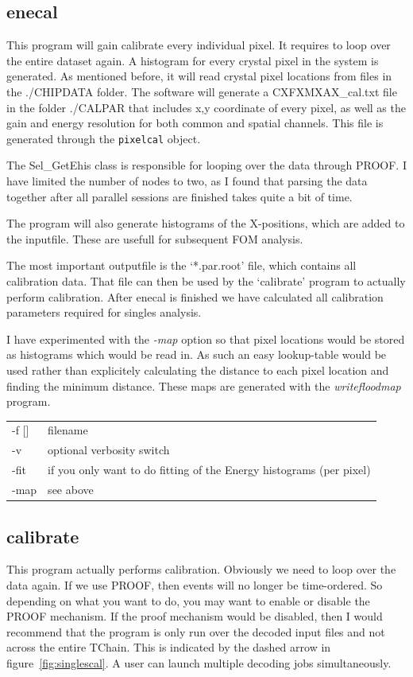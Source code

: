 \documentclass[12pt]{article}
\begin{document}
\subsection{enecal}
This program will gain calibrate every individual pixel. It requires to loop over the entire dataset again. A histogram for every crystal pixel in the system is generated. As mentioned before, it will read crystal pixel locations from files in the ./CHIPDATA folder. The software will generate a  CXFXMXAX\_cal.txt file in the folder ./CALPAR that includes x,y coordinate of every pixel, as well as the gain and energy resolution for both common and spatial channels. This file is generated through the {\tt pixelcal} object. 

The Sel\_GetEhis class is responsible for looping over the data through PROOF. I have limited the number of nodes to two, as I found that parsing the data together after all parallel sessions are finished takes quite a bit of time. 

The program will also generate histograms of the X-positions, which are added to the inputfile. These are usefull for subsequent FOM analysis. 

The most important outputfile is the `*.par.root' file, which contains all calibration data. That file can then be used by the `calibrate' program to actually perform calibration. After enecal is finished we have calculated all calibration parameters required for singles analysis.

I have experimented with the {\em -map} option so that pixel locations would be stored as histograms which would be read in. As such an easy lookup-table would be used rather than explicitely calculating the distance to each pixel location and finding the minimum distance. These maps are generated with the {\em writefloodmap} program.

\begin{tabular}{ll}
-f []& filename\\
-v & optional verbosity switch\\
-fit & if you only want to do fitting of the Energy histograms (per pixel)\\
-map & see above\\
\end{tabular}

\subsection{calibrate}
This program actually performs calibration. Obviously we need to loop over the data again. If we use PROOF, then events will no longer be time-ordered. So depending on what you want to do, you may want to enable or disable the PROOF mechanism. If the proof mechanism would be disabled, then I would recommend that the program is only run over the decoded input files and not across the entire TChain. This is indicated by the dashed arrow in figure~\ref{fig:singlescal}. A user can launch multiple decoding jobs simultaneously. 
\end{document}
